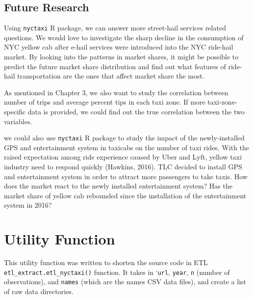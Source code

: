 \documentclass[12pt,twoside]{reedthesis}
\newenvironment{Shaded}{\begin{snugshade}}{\end{snugshade}}
\newcommand{\KeywordTok}[1]{\textcolor[rgb]{0.13,0.29,0.53}{\textbf{#1}}}
\newcommand{\DataTypeTok}[1]{\textcolor[rgb]{0.13,0.29,0.53}{#1}}
\newcommand{\StringTok}[1]{\textcolor[rgb]{0.31,0.60,0.02}{#1}}
\newcommand{\ControlFlowTok}[1]{\textcolor[rgb]{0.13,0.29,0.53}{\textbf{#1}}}
\newcommand{\OperatorTok}[1]{\textcolor[rgb]{0.81,0.36,0.00}{\textbf{#1}}}
\newcommand{\NormalTok}[1]{#1}
\theoremstyle{definition}
\theoremstyle{definition}
\theoremstyle{definition}
\theoremstyle{remark}
\begin{document}
\section{Future Research}\label{future-research}

Using \texttt{nyctaxi} R package, we can answer more street-hail
services related questions. We would love to investigate the sharp
decline in the consumption of NYC yellow cab after e-hail services were
introduced into the NYC ride-hail market. By looking into the patterns
in market shares, it might be possible to predict the future market
share distribution and find out what features of ride-hail
transportation are the ones that affect market share the most.

As mentioned in Chapter 3, we also want to study the correlation between
number of trips and average percent tips in each taxi zone. If more
taxi-zone-specific data is provided, we could find out the true
correlation between the two variables.

we could also use \texttt{nyctaxi} R package to study the impact of the
newly-installed GPS and entertainment system in taxicabs on the number
of taxi rides. With the raised expectation among ride experience caused
by Uber and Lyft, yellow taxi industry need to respond quickly (Hawkins,
2016). TLC decided to install GPS and entertainment system in order to
attract more passengers to take taxis. How does the market react to the
newly installed entertainment system? Has the market share of yellow cab
rebounded since the installation of the entertainment system in 2016?

\appendix

\chapter{Utility Function}\label{utility-function}

This utility function was written to shorten the source code in ETL
\texttt{etl\_extract.etl\_nyctaxi()} function. It takes in
`\texttt{url}, \texttt{year}, \texttt{n} (number of observations), and
\texttt{names} (which are the names CSV data files), and create a list
of raw data directories.
\begin{Shaded}
\end{Shaded}
\end{document}

